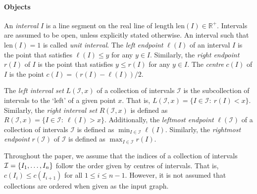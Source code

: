\begin{toappendix}
\paragraph*{Objects}
    An \emph{interval} $I$ is a line segment on the real line of length $\mathrm{len}(I) \in \mathbb{R}^+$.
    Intervals are assumed to be open, unless explicitly stated otherwise.
    An interval such that $\mathrm{len}(I) = 1$ is called \emph{unit interval}.
    The \emph{left endpoint} $\ell(I)$ of an interval $I$ is the point that satisfies $\ell(I) \le y$ for any $y \in I$. 
    Similarly, the \emph{right endpoint} $r(I)$ of $I$ is the point that satisfies $y \le r(I)$ for any $y \in I$.
    The \emph{centre} $c(I)$ of $I$ is the point $c(I) = (r(I) - \ell(I))/2$.
%
\begin{toappendix}
    The \emph{left interval set} $L(\mathcal{I}, x)$ of a collection of intervals $\mathcal{I}$ is the subcollection of intervals to the `left' of a given point $x$.
    That is, $L(\mathcal{I}, x) = \{I \in \mathcal{I}:\: r(I) < x\}$. 
    Similarly, the \emph{right interval set} $R(\mathcal{I},x)$ is defined as $R(\mathcal{I},x) = \{I\in \mathcal{I}:\:\ell(I) > x\}$.
    Additionally, the \emph{leftmost endpoint} $\ell(\mathcal I)$ of a collection of intervals $\mathcal{I}$ is defined as $\min_{I \in \mathcal I} \ell(I)$.
    Similarly, the \emph{rightmost endpoint} $r(\mathcal I)$ of $\mathcal{I}$ is defined as $\max_{I \in \mathcal I} r(I)$.
\end{toappendix}
    Throughout the paper, we assume that the indices of a collection of intervals $\mathcal{I} = \{I_1,\ldots,I_n\}$ follow the order given by centres of intervals.
    That is, $c(I_{i}) \le c(I_{i+1})$ for all $1\le i\le n-1$.
    However, it is not assumed that collections are ordered when given as the input graph.

\end{toappendix}
